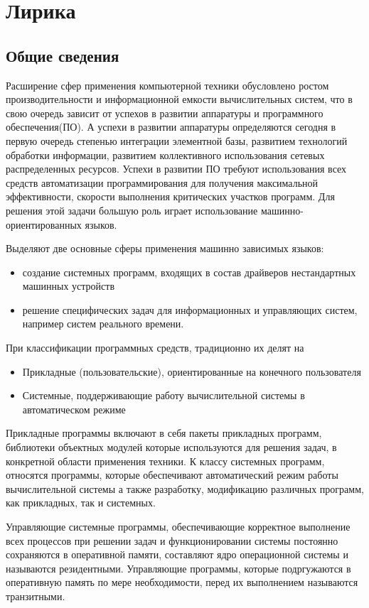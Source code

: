 \section{Лирика}
\subsection{Общие сведения}
Расширение сфер применения компьютерной техники обусловлено ростом производительности и информационной емкости вычислительных систем, 
что в свою очередь зависит от успехов в развитии аппаратуры и программного обеспечения(ПО). 
А успехи в развитии аппаратуры определяются сегодня в первую очередь степенью интеграции элементной базы, 
развитием технологий обработки информации, развитием коллективного использования сетевых распределенных ресурсов. 
Успехи в развитии ПО требуют использования всех средств автоматизации программирования для получения максимальной эффективности, скорости выполнения критических участков программ. 
Для решения этой задачи большую роль играет использование машинно-ориентированных языков.

Выделяют две основные сферы применения машинно зависимых языков:
\begin{itemize}
    \item создание системных программ, входящих в состав драйверов нестандартных машинных устройств
    \item решение специфических задач для информационных и управляющих систем, например систем реального времени.
\end{itemize}

При классификации программных средств, традиционно их делят на
\begin{itemize}
    \item Прикладные (пользовательские), ориентированные на конечного пользователя
    \item Системные, поддерживающие работу вычислительной системы в автоматическом режиме
\end{itemize}
Прикладные программы включают в себя пакеты прикладных программ, библиотеки объектных модулей
которые используются для решения задач, в конкретной области применения техники.
К классу системных программ, относятся программы, которые обеспечивают автоматический режим работы вычислительной системы
а также разработку, модификацию различных программ, как прикладных, так и системных.

Управляющие системные программы, обеспечивающие корректное выполнение всех процессов
при решении задач и функционировании системы постоянно сохраняются в оперативной памяти,
составляют ядро операционной системы и называются резидентными.
Управляющие программы, которые подргужаются в оперативную память по мере необходимости, перед их выполнением
называются транзитными. 

